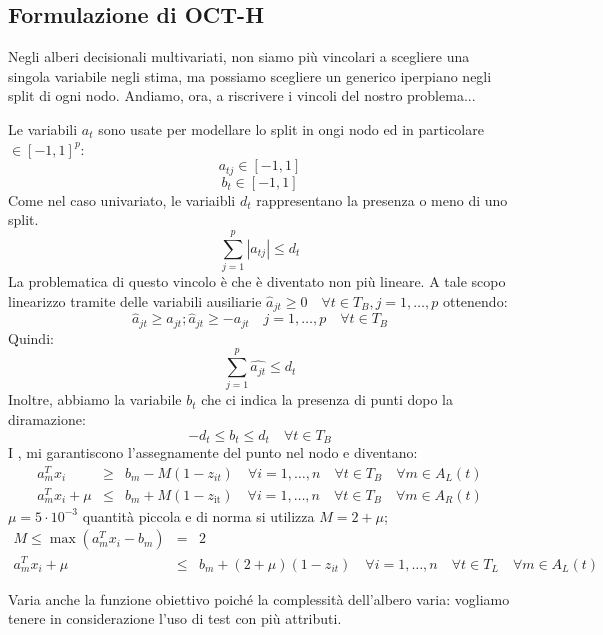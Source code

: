 \documentclass{article}
\newcommand{\textdots}{...}
\newcommand{\tmop}[1]{\ensuremath{\operatorname{#1}}}
\newcommand{\tmtextbf}[1]{\text{{\bfseries{#1}}}}
\begin{document}
\subsection{Formulazione di OCT-H}

Negli alberi decisionali multivariati, non siamo pi{\`u} vincolari a scegliere
una singola variabile negli stima, ma possiamo scegliere un generico iperpiano
negli split di ogni nodo. Andiamo, ora, a riscrivere i vincoli del nostro
problema{\textdots}

Le variabili $a_t$ sono usate per modellare lo split in ongi nodo ed in
particolare $\in [- 1, 1]^p$:
\[ a_{t j} \in [- 1, 1] \]
\[ b_t \in [- 1, 1] \]
Come nel caso univariato, le variaibli $d_t$ rappresentano la presenza o meno
di uno split.
\[ \sum_{j = 1}^p | a_{t j} | \leqslant d_t \]
La problematica di questo vincolo {\`e} che {\`e} diventato non pi{\`u}
lineare. A tale scopo linearizzo tramite delle variabili ausiliarie
$\hat{a}_{j t} \geqslant 0 \quad \forall t \in T_B, j = 1, \ldots, p$
ottenendo:
\[ \hat{a}_{j t} \geqslant a_{j t} ; \hat{a}_{j t} \geqslant - a_{j t} \quad j
   = 1, \ldots, p \quad \forall t \in T_B \]
Quindi:
\[ \sum_{j = 1}^p \widehat{a_{j t}} \leqslant d_t \]
Inoltre, abbiamo la variabile $b_t$ che ci indica la presenza di punti dopo la
diramazione:
\[ - d_t \leqslant b_t \leqslant d_t \quad \forall t \in T_B \]
I \tmtextbf{vincoli di consistenza}, mi garantiscono l'assegnamente del punto
nel nodo e diventano:
\begin{eqnarray*}
  a_m^T x_i & \geqslant & b_m - M (1 - z_{i t}) \quad \forall i = 1, \ldots, n
  \quad \forall t \in T_B \quad \forall m \in A_L (t)\\
  a_m^T x_i + \mu & \leqslant & b_m + M (1 - z_{\tmop{it}}) \quad \forall i =
  1, \ldots, n \quad \forall t \in T_B \quad \forall m \in A_R (t)
\end{eqnarray*}
$\mu = 5 \cdot 10^{- 3}$ quantit{\`a} piccola e di norma si utilizza $M = 2 +
\mu$;
\begin{eqnarray*}
  M \leqslant \max (a_m^T x_i - b_m) & = & 2 \quad\\
  a_m^T x_i + \mu & \leqslant & b_m + (2 + \mu)  (1 - z_{i t}) \quad \forall i
  = 1, \ldots, n \quad \forall t \in T_L \quad \forall m \in A_L (t)
\end{eqnarray*}
\begin{flushleft}
  Varia anche la funzione obiettivo poich{\'e} la complessit{\`a} dell'albero
  varia: vogliamo tenere in considerazione l'uso di test con pi{\`u}
  attributi.
\end{flushleft}
\end{document}
